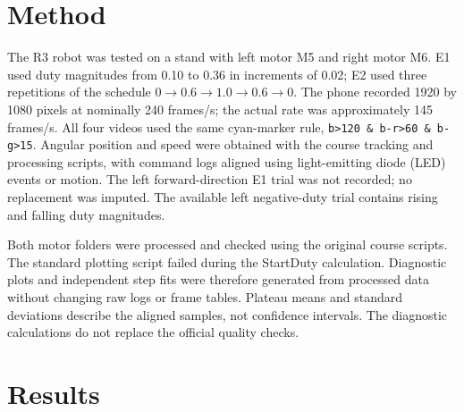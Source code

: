 \documentclass[11pt,a4paper]{article}
\begin{document}
\section{Method}
The R3 robot was tested on a stand with left motor M5 and right motor M6. E1 used duty magnitudes from 0.10 to 0.36 in increments of 0.02; E2 used three repetitions of the schedule $0\to0.6\to1.0\to0.6\to0$. The phone recorded 1920 by 1080 pixels at nominally 240 frames/s; the actual rate was approximately 145 frames/s. All four videos used the same cyan-marker rule, \texttt{b>120 \& b-r>60 \& b-g>15}. Angular position and speed were obtained with the course tracking and processing scripts, with command logs aligned using light-emitting diode (LED) events or motion. The left forward-direction E1 trial was not recorded; no replacement was imputed. The available left negative-duty trial contains rising and falling duty magnitudes.

Both motor folders were processed and checked using the original course scripts. The standard plotting script failed during the StartDuty calculation. Diagnostic plots and independent step fits were therefore generated from processed data without changing raw logs or frame tables. Plateau means and standard deviations describe the aligned samples, not confidence intervals. The diagnostic calculations do not replace the official quality checks.
\section{Results}
\end{document}
